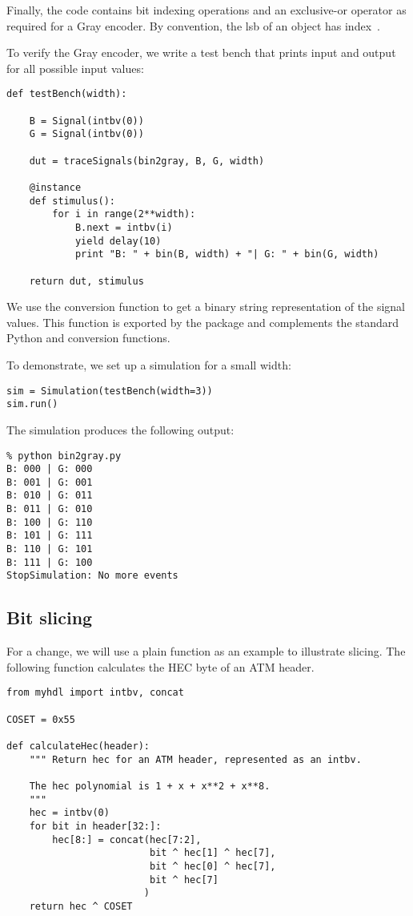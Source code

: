 Finally, the code contains bit indexing operations and an exclusive-or
operator as required for a Gray encoder. By convention, the lsb of an
 object has index~.

To verify the Gray encoder, we write a test bench that prints input
and output for all possible input values:

\begin{verbatim}
def testBench(width):
    
    B = Signal(intbv(0))
    G = Signal(intbv(0))
    
    dut = traceSignals(bin2gray, B, G, width)

    @instance
    def stimulus():
        for i in range(2**width):
            B.next = intbv(i)
            yield delay(10)
            print "B: " + bin(B, width) + "| G: " + bin(G, width)

    return dut, stimulus
\end{verbatim}

We use the conversion function  to get a binary
string representation of the signal values. This function is exported
by the  package and complements the standard Python
 and  conversion functions.

To demonstrate, we set up a simulation for a small width: 

\begin{verbatim}
sim = Simulation(testBench(width=3))
sim.run()
\end{verbatim}

The simulation produces the following output:

\begin{verbatim}
% python bin2gray.py
B: 000 | G: 000
B: 001 | G: 001
B: 010 | G: 011
B: 011 | G: 010
B: 100 | G: 110
B: 101 | G: 111
B: 110 | G: 101
B: 111 | G: 100
StopSimulation: No more events
\end{verbatim}

\subsection{Bit slicing \label{intro-slicing}}

For a change, we will use a plain function as an example to illustrate
slicing.  The following function calculates the HEC byte of an ATM
header.

\begin{verbatim}
from myhdl import intbv, concat

COSET = 0x55

def calculateHec(header):
    """ Return hec for an ATM header, represented as an intbv.

    The hec polynomial is 1 + x + x**2 + x**8.
    """
    hec = intbv(0)
    for bit in header[32:]:
        hec[8:] = concat(hec[7:2],
                         bit ^ hec[1] ^ hec[7],
                         bit ^ hec[0] ^ hec[7],
                         bit ^ hec[7]
                        )
    return hec ^ COSET
\end{verbatim}

